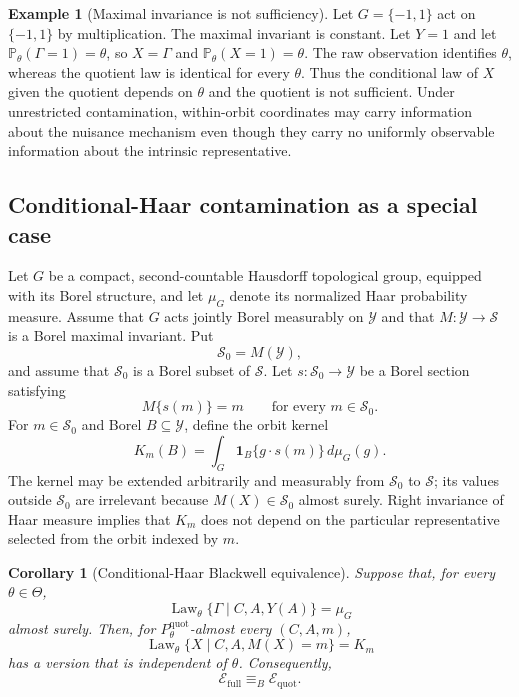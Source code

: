 \documentclass[11pt]{article}
\theoremstyle{plain}
\newtheorem{corollary}[theorem]{Corollary}
\theoremstyle{definition}
\newtheorem{example}[theorem]{Example}
\numberwithin{equation}{section}
\DeclareMathOperator{\Law}{Law}
\newcommand{\Prob}{\mathbb P}
\newcommand{\1}{\mathbf 1}
\newcommand{\calE}{\mathcal E}
\newcommand{\calS}{\mathcal S}
\newcommand{\calY}{\mathcal Y}
\newcommand{\full}{\mathrm{full}}
\newcommand{\quot}{\mathrm{quot}}
\begin{document}
\begin{example}[Maximal invariance is not sufficiency]\label{ex:sign}
Let $G=\{-1,1\}$ act on $\{-1,1\}$ by multiplication. The maximal invariant is constant. Let $Y=1$ and let $\Prob_\theta(\Gamma=1)=\theta$, so $X=\Gamma$ and $\Prob_\theta(X=1)=\theta$. The raw observation identifies $\theta$, whereas the quotient law is identical for every $\theta$. Thus the conditional law of $X$ given the quotient depends on $\theta$ and the quotient is not sufficient. Under unrestricted contamination, within-orbit coordinates may carry information about the nuisance mechanism even though they carry no uniformly observable information about the intrinsic representative.
\end{example}

\subsection{Conditional-Haar contamination as a special case}

Let $G$ be a compact, second-countable Hausdorff topological group, equipped
with its Borel structure, and let $\mu_G$ denote its normalized Haar
probability measure. Assume that $G$ acts jointly
Borel measurably on $\calY$ and that
$M:\calY\to\calS$ is a Borel maximal invariant. Put
\[
\calS_0=M(\calY),
\]
and assume that $\calS_0$ is a Borel subset of $\calS$. Let
$s:\calS_0\to\calY$ be a Borel section satisfying
\[
M\{s(m)\}=m
\qquad\text{for every }m\in\calS_0.
\]
For $m\in\calS_0$ and Borel $B\subseteq\calY$, define the orbit kernel
\begin{equation}\label{eq:haar-kernel}
	K_m(B)
	=
	\int_G
	\mathbf 1_B\{g\cdot s(m)\}\,d\mu_G(g).
\end{equation}
The kernel may be extended arbitrarily and measurably from $\calS_0$
to $\calS$; its values outside $\calS_0$ are irrelevant because
$M(X)\in\calS_0$ almost surely. Right invariance of Haar measure implies
that $K_m$ does not depend on the particular representative selected
from the orbit indexed by $m$.

\begin{corollary}[Conditional-Haar Blackwell equivalence]\label{cor:haar}
	Suppose that, for every \(\theta\in\Theta\),
	\begin{equation}\label{eq:cond-haar}
		\Law_\theta\{\Gamma\mid C,A,Y(A)\}=\mu_G
	\end{equation}
	almost surely. Then, for \(P_\theta^{\quot}\)-almost every
	\((C,A,m)\),
	\[
	\Law_\theta\{X\mid C,A,M(X)=m\}=K_m
	\]
	has a version that is independent of \(\theta\). Consequently,
	\[
	\calE_{\full}\equiv_B\calE_{\quot}.
	\]
\end{corollary}
\end{document}
